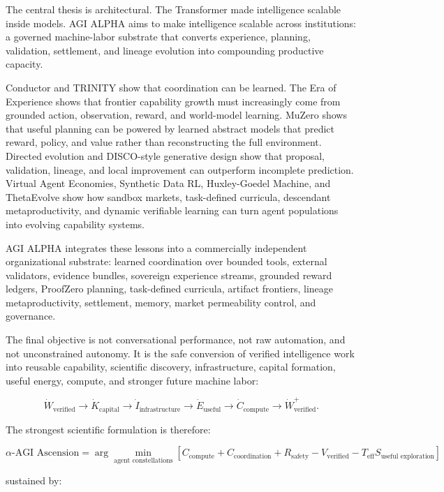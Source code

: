 \documentclass[11pt]{article}
\begin{document}
The central thesis is architectural. The Transformer made intelligence scalable inside models. AGI ALPHA aims to make intelligence scalable across institutions: a governed machine-labor substrate that converts experience, planning, validation, settlement, and lineage evolution into compounding productive capacity.

Conductor and TRINITY show that coordination can be learned. The Era of Experience shows that frontier capability growth must increasingly come from grounded action, observation, reward, and world-model learning. MuZero shows that useful planning can be powered by learned abstract models that predict reward, policy, and value rather than reconstructing the full environment. Directed evolution and DISCO-style generative design show that proposal, validation, lineage, and local improvement can outperform incomplete prediction. Virtual Agent Economies, Synthetic Data RL, Huxley-Goedel Machine, and ThetaEvolve show how sandbox markets, task-defined curricula, descendant metaproductivity, and dynamic verifiable learning can turn agent populations into evolving capability systems.

AGI ALPHA integrates these lessons into a commercially independent organizational substrate: learned coordination over bounded tools, external validators, evidence bundles, sovereign experience streams, grounded reward ledgers, ProofZero planning, task-defined curricula, artifact frontiers, lineage metaproductivity, settlement, memory, market permeability control, and governance.

The final objective is not conversational performance, not raw automation, and not unconstrained autonomy. It is the safe conversion of verified intelligence work into reusable capability, scientific discovery, infrastructure, capital formation, useful energy, compute, and stronger future machine labor:

\[
\dot W_{\mathrm{verified}}\rightarrow\dot K_{\mathrm{capital}}\rightarrow\dot I_{\mathrm{infrastructure}}\rightarrow\dot E_{\mathrm{useful}}\rightarrow\dot C_{\mathrm{compute}}\rightarrow\dot W_{\mathrm{verified}}^{+}.
\]

The strongest scientific formulation is therefore:

\[
\boxed{
\alpha\text{-AGI Ascension}
=
\arg\min_{\text{agent constellations}}
\left[
C_{\text{compute}}+C_{\text{coordination}}+R_{\text{safety}}-V_{\text{verified}}-T_{\text{eff}}S_{\text{useful exploration}}
\right]
}
\]

sustained by:
\end{document}
